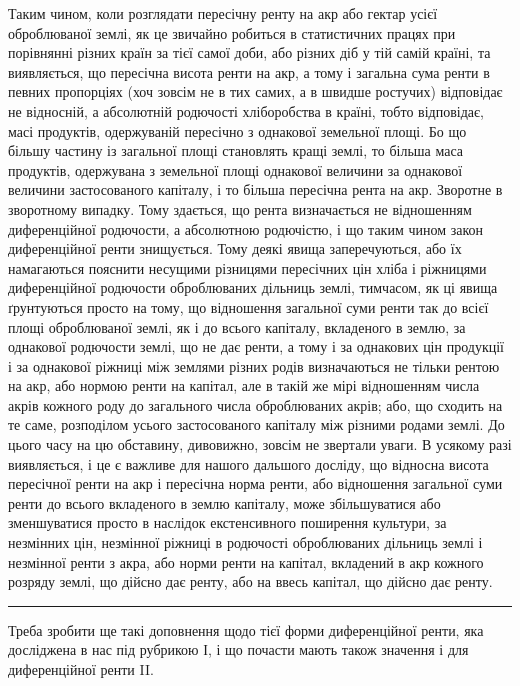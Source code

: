 Таким чином, коли розглядати пересічну ренту на акр або гектар усієї
оброблюваної землі, як це звичайно робиться в статистичних працях при порівнянні
різних країн за тієї самої доби, або різних діб у тій самій країні, та
виявляється, що пересічна висота ренти на акр, а тому і загальна сума ренти
в певних пропорціях (хоч зовсім не в тих самих, а в швидше ростучих) відповідає
не відносній, а абсолютній родючості хліборобства в країні, тобто відповідає,
масі продуктів, одержуваній пересічно з однакової земельної площі. Бо що
більшу частину із загальної площі становлять кращі землі, то більша маса
продуктів, одержувана з земельної площі однакової величини за однакової величини
застосованого капіталу, і то більша пересічна рента на акр. Зворотне в зворотному
випадку. Тому здається, що рента визначається не відношенням диференційної
родючости, а абсолютною родючістю, і що таким чином закон диференційної
ренти знищується. Тому деякі явища заперечуються, або їх намагаються
пояснити несущими різницями пересічних цін хліба і ріжницями диференційної
родючости оброблюваних дільниць землі, тимчасом, як ці явища ґрунтуються
просто на тому, що відношення загальної суми ренти так до всієї площі оброблюваної
землі, як і до всього капіталу, вкладеного в землю, за однакової родючости
землі, що не дає ренти, а тому і за однакових цін продукції і за
однакової ріжниці між землями різних родів визначаються не тільки рентою
на акр, або нормою ренти на капітал, але в такій же мірі відношенням числа
акрів кожного роду до загального числа оброблюваних акрів; або, що сходить
на те саме, розподілом усього застосованого капіталу між різними родами землі.
До цього часу на цю обставину, дивовижно, зовсім не звертали уваги. В усякому
разі виявляється, і це є важливе для нашого дальшого досліду, що відносна
висота пересічної ренти на акр і пересічна норма ренти, або відношення
загальної суми ренти до всього вкладеного в землю капіталу, може збільшуватися
або зменшуватися просто в наслідок екстенсивного поширення культури,
за незмінних цін, незмінної ріжниці в родючості оброблюваних дільниць землі
і незмінної ренти з акра, або норми ренти на капітал, вкладений в акр
кожного розряду землі, що дійсно дає ренту, або на ввесь капітал, що дійсно
дає ренту.

\pfbreak

Треба зробити ще такі доповнення щодо тієї форми диференційної ренти,
яка досліджена в нас під рубрикою І, і що почасти мають також значення і
для диференційної ренти II.

